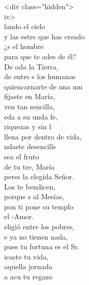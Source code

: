 \begin{cancion}%
<div class="hidden">\\
	iv>\\
	lando el cielo \\
	y las estre que has creado\\
	¿s el hombre  \\
	para que te ades de él?\\
	De oda la Tierra, \\
	de entre s los humanos\\
	quiencarnarte de una mu\\
	fijaste en María, \\
	ven tan sencilla,\\
	eda a su unda fe,\\
	 riquezas y sin l\\
llena por dentro de vida,\\
	ndaste desencille  \\
\jump
	 sea el fruto \\
	de tu tre, María\\
	peres la elegida Señor.\\
	Los  te bendicen, \\
	porque s al Mesías,\\
	pon ti pone su templo \\
	el -Amor.\\
	eligió entre los pobres, \\
	e ya no tienen nada,\\
	pues tu  fortuna es el Sr.\\
	icaste tu vida, \\
	aquella jornada\\
	a acu tu regazo \\

\end{cancion}
